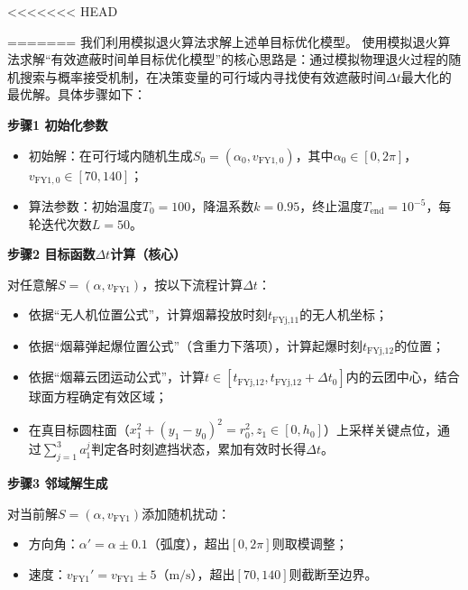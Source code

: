 \documentclass[../main.tex]{subfiles}
\begin{document}

<<<<<<< HEAD






















=======
我们利用模拟退火算法求解上述单目标优化模型。
使用模拟退火算法求解“有效遮蔽时间单目标优化模型”的核心思路是：通过模拟物理退火过程的随机搜索与概率接受机制，在决策变量的可行域内寻找使有效遮蔽时间$\Delta t$最大化的最优解。具体步骤如下：

\noindent\textbf{步骤1 初始化参数}
\begin{itemize}
    \item 初始解：在可行域内随机生成$S_0=(\alpha_0, v_{\text{FY1},0})$，其中$\alpha_0 \in [0,2\pi]$，$v_{\text{FY1},0} \in [70,140]$；
    \item 算法参数：初始温度$T_0=100$，降温系数$k=0.95$，终止温度$T_{\text{end}}=10^{-5}$，每轮迭代次数$L=50$。
\end{itemize}

\noindent\textbf{步骤2 目标函数$\Delta t$计算（核心）}

对任意解$S=(\alpha, v_{\text{FY1}})$，按以下流程计算$\Delta t$：
\begin{itemize}
    \item 依据“无人机位置公式”，计算烟幕投放时刻$t_{\text{FYj,11}}$的无人机坐标；
    \item 依据“烟幕弹起爆位置公式”（含重力下落项），计算起爆时刻$t_{\text{FYj,12}}$的位置；
    \item 依据“烟幕云团运动公式”，计算$t \in [t_{\text{FYj,12}}, t_{\text{FYj,12}}+\Delta t_0]$内的云团中心，结合球面方程确定有效区域；
    \item 在真目标圆柱面（$x_1^2+(y_1-y_0)^2=r_0^2, z_1 \in [0,h_0]$）上采样关键点位，通过$\sum_{j=1}^3 a_1^j$判定各时刻遮挡状态，累加有效时长得$\Delta t$。
\end{itemize}

\noindent\textbf{步骤3 邻域解生成}

对当前解$S=(\alpha, v_{\text{FY1}})$添加随机扰动：
\begin{itemize}
    \item 方向角：$\alpha' = \alpha \pm 0.1$（弧度），超出$[0,2\pi]$则取模调整；
    \item 速度：$v_{\text{FY1}}' = v_{\text{FY1}} \pm 5$（$\text{m/s}$），超出$[70,140]$则截断至边界。
\end{itemize}
\end{document}
